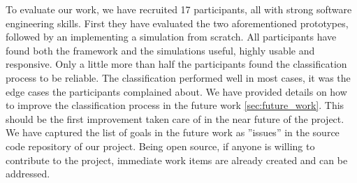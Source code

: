 To evaluate our work, we have recruited 17 participants, all with strong software engineering skills. First they have evaluated the two aforementioned prototypes, followed by an implementing a simulation from scratch. All participants have found both the framework and the simulations useful, highly usable and responsive. Only a little more than half the participants found the classification process to be reliable. The classification performed well in most cases, it was the edge cases the participants complained about. We have provided details on how to improve the classification process in the future work \ref{sec:future_work}. This should be the first improvement taken care of in the near future of the project.\\

We have captured the list of goals in the future work as ''issues'' in the source code repository of our project.  Being open source, if anyone is willing to contribute to the project, immediate work items are already created and can be addressed.\\




